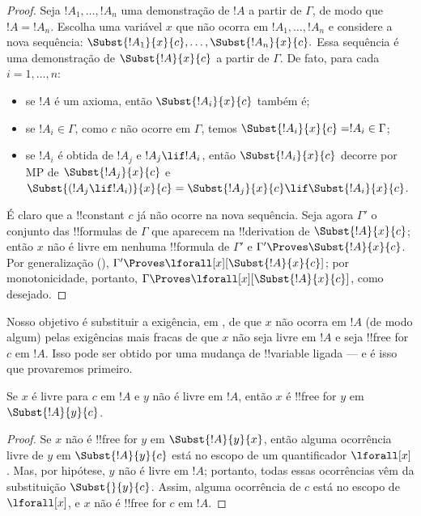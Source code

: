 \documentclass[../../../include/open-logic-section]{subfiles}
\begin{document}
\begin{proof} Seja $!A_1,\ldots,!A_n$ uma demonstração de $!A$ a partir de $\Gamma$, de modo
que $!A=!A_n$. Escolha uma variável $x$ que não ocorra em $!A_1,\ldots,!A_n$ e considere
a nova sequência: $\Subst{!A_1}{x}{c},\ldots,\Subst{!A_n}{x}{c}.$ Essa
sequência é uma demonstração de $\Subst{!A}{x}{c}$ a partir de $\Gamma$. De fato, para cada
$i=1,\ldots,n$: \begin{itemize} \item se $!A$ é um axioma, então
$\Subst{!A_i}{x}{c}$ também é; \item se $!A_i \in \Gamma$, como $c$ não ocorre em
$\Gamma$, temos $\Subst{!A_i}{x}{c} = !A_i \in \Gamma$; \item se $!A_i$
é obtida de $!A_j$ e $!A_j \lif !A_i$, então $\Subst{!A_i}{x}{c}$
decorre por MP de $\Subst{!A_j}{x}{c}$ e $\Subst{(!A_j \lif !A_i)}{x}{c}
= \Subst{!A_j}{x}{c} \lif \Subst{!A_i}{x}{c}$. \end{itemize} É claro
que a !!{constant} $c$ já não ocorre na nova sequência. Seja agora
$\Gamma'$ o conjunto das !!{formula}s de $\Gamma$ que aparecem na
!!{derivation} de $\Subst{!A}{x}{c}$; então $x$ não é livre em nenhuma
!!{formula} de $\Gamma'$ e $\Gamma' \Proves \Subst{!A}{x}{c}$. Por
generalização (), $\Gamma'
\Proves \lforall[x][\Subst{!A}{x}{c}]$; por monotonicidade, portanto, $\Gamma \Proves
\lforall[x][\Subst{!A}{x}{c}]$, como desejado. 
\end{proof}

\begin{explain}
Nosso objetivo é substituir a exigência, em , de que $x$
não ocorra em $!A$ (de modo algum) pelas exigências mais fracas de que $x$
não seja livre em $!A$ e seja !!{free for} $c$ em $!A$. Isso pode ser
obtido por uma mudança de !!{variable} ligada --- e é isso que
provaremos primeiro.
\end{explain}

\begin{lem}
Se $x$ é livre para $c$ em $!A$ e $y$ não é livre em $!A$, então $x$
é !!{free for} $y$ em $\Subst{!A}{y}{c}$.
\end{lem}

\begin{proof} Se $x$ não é !!{free for} $y$ em $\Subst{!A}{y}{x}$, então
alguma ocorrência livre de $y$ em $\Subst{!A}{y}{c}$ está no escopo de
um quantificador $\lforall[x]$. Mas, por hipótese, $y$ não é livre em $!A$; portanto,
todas essas ocorrências vêm da substituição $\Subst{}{y}{c}$. Assim, alguma
ocorrência de $c$ está no escopo de $\lforall[x]$, e $x$ não é
!!{free for} $c$ em $!A$. 
\end{proof}
\end{document}
